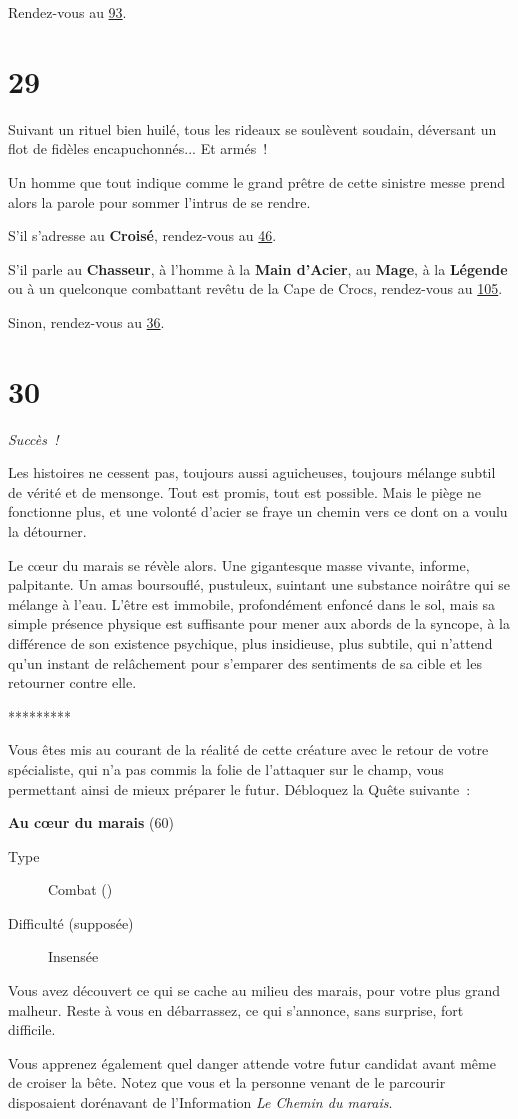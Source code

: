 \documentclass{report}
\newcommand{\gsection}[1]{
    \section{#1}
    \label{section-#1}
}
\newcommand{\glink}[1]{\hyperref[section-#1]{#1}}
\newcommand{\quest}[5]{
    \begin{mdframed}[innertopmargin=0.5cm,innerbottommargin=0.5cm,leftmargin=0.5cm,rightmargin=0.5cm]
        \begin{center}
            \textbf{#1} (#2)
        \end{center}
        \begin{description}
            \item[Type] #3
            \item[Difficulté (supposée)] #4
        \end{description}
        #5
    \end{mdframed}
}
\newcommand{\ellipse}{
    \begin{center}
        *********
    \end{center}
}
\newcommand{\success}{\emph{Succès !}}
\newcommand{\hero}[1]{\textbf{#1}}
\begin{document}
Rendez-vous au \glink{93}.

\gsection{29}

Suivant un rituel bien huilé, tous les rideaux se soulèvent soudain, déversant un flot de fidèles encapuchonnés... Et armés !

Un homme que tout indique comme le grand prêtre de cette sinistre messe prend alors la parole pour sommer l'intrus de se rendre.

S'il s'adresse au \hero{Croisé}, rendez-vous au \glink{46}.

S'il parle au \hero{Chasseur}, à l'homme à la \hero{Main d'Acier}, au \hero{Mage}, à la \hero{Légende} ou à un quelconque  combattant revêtu de la Cape de Crocs, rendez-vous au \glink{105}.

Sinon, rendez-vous au \glink{36}.

\gsection{30}

\success

Les histoires ne cessent pas, toujours aussi aguicheuses, toujours mélange subtil de vérité et de mensonge. Tout est promis, tout est possible. Mais le piège ne fonctionne plus, et une volonté d'acier se fraye un chemin vers ce dont on a voulu la détourner.

Le cœur du marais se révèle alors. Une gigantesque masse vivante, informe, palpitante. Un amas boursouflé, pustuleux, suintant une substance noirâtre qui se mélange à l'eau. L'être est immobile, profondément enfoncé dans le sol, mais sa simple présence physique est suffisante pour mener aux abords de la syncope, à la différence de son existence psychique, plus insidieuse, plus subtile, qui n'attend qu'un instant de relâchement pour s'emparer des sentiments de sa cible et les retourner contre elle.

\ellipse

Vous êtes mis au courant de la réalité de cette créature avec le retour de votre spécialiste, qui n'a pas commis la folie de l'attaquer sur le champ, vous permettant ainsi de mieux préparer le futur. Débloquez la Quête suivante :

\quest{Au cœur du marais}{60}{Combat (\caduceus)}{Insensée}{
Vous avez découvert ce qui se cache au milieu des marais, pour votre plus grand malheur. Reste à vous en débarrassez, ce qui s'annonce, sans surprise, fort difficile.
}

Vous apprenez également quel danger attende votre futur candidat avant même de croiser la bête. Notez que vous et la personne venant de le parcourir disposaient dorénavant de l'Information \emph{Le Chemin du marais}.
\end{document}

